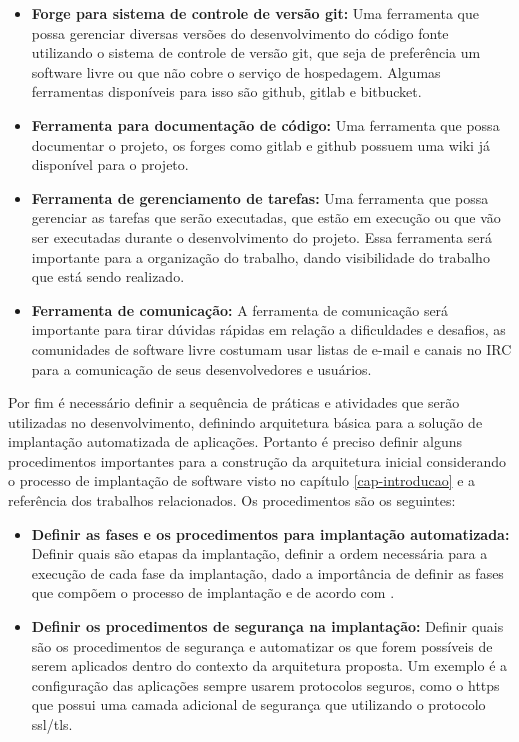 \begin{itemize}
  \item \textbf{Forge para sistema de controle de versão git:} Uma ferramenta que
  possa gerenciar diversas versões do desenvolvimento do código fonte utilizando
  o sistema de controle de versão git, que seja de preferência um software livre
  ou que não cobre o serviço de hospedagem. Algumas ferramentas disponíveis para
  isso são github, gitlab e bitbucket.
  \item \textbf{Ferramenta para documentação de código:} Uma ferramenta que possa
  documentar o projeto, os forges como gitlab e github possuem uma wiki já disponível
  para o projeto.
  \item \textbf{Ferramenta de gerenciamento de tarefas:} Uma ferramenta que possa
  gerenciar as tarefas que serão executadas, que estão em execução ou que vão ser executadas
  durante o desenvolvimento do projeto. Essa ferramenta será importante para a
  organização do trabalho, dando visibilidade do trabalho que está sendo realizado.
  \item \textbf{Ferramenta de comunicação:} A ferramenta de comunicação será
  importante para tirar dúvidas rápidas em relação a dificuldades e desafios, as
  comunidades de software livre costumam usar listas de e-mail e canais no IRC
  para a comunicação de seus desenvolvedores e usuários.
\end{itemize}

Por fim é necessário definir a sequência de práticas e atividades que serão
utilizadas no desenvolvimento, definindo arquitetura básica para a solução de
implantação automatizada de aplicações. Portanto é preciso definir alguns
procedimentos importantes para a construção da arquitetura inicial considerando
o processo de implantação de software visto no capítulo \ref{cap-introducao}
e a referência dos trabalhos relacionados. Os procedimentos são os seguintes:

\begin{itemize}
  \item  \textbf{Definir as fases e os procedimentos para implantação automatizada:}
   Definir quais são etapas da implantação, definir a ordem necessária para a execução de
  cada fase da implantação, dado a importância de definir as fases que compõem o processo de
  implantação e de acordo com \cite{omg2006}.
  \item  \textbf{Definir os procedimentos de segurança na implantação:} Definir
  quais são os procedimentos de segurança e automatizar os que forem possíveis
  de serem aplicados dentro do contexto da arquitetura proposta. Um exemplo
  é a configuração das aplicações sempre usarem protocolos seguros, como o https
  que possui uma camada adicional de segurança que utilizando o protocolo ssl/tls.
\end{itemize}

